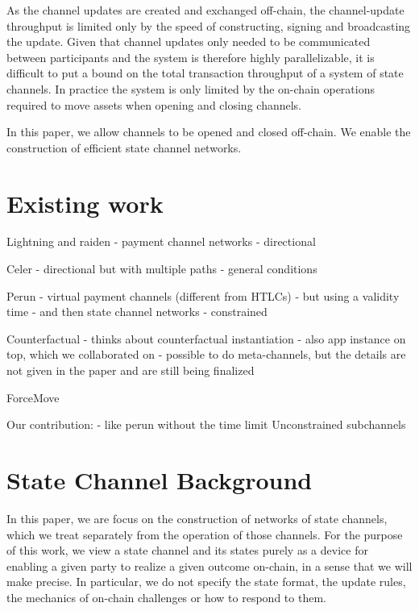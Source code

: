 \documentclass{article}
\theoremstyle{definition}
\begin{document}
As the channel updates are created and exchanged off-chain, the channel-update throughput is limited only by the speed of constructing, signing and broadcasting the update.
Given that channel updates only needed to be communicated between participants and the system is therefore highly parallelizable, it is difficult to put a bound on the total transaction throughput of a system of state channels.
In practice the system is only limited by the on-chain operations required to move assets when opening and closing channels.

In this paper, we allow channels to be opened and closed off-chain. We enable the construction of efficient state channel networks.

\section{Existing work}

Lightning and raiden
- payment channel networks
- directional

Celer
- directional but with multiple paths
- general conditions

Perun
- virtual payment channels (different from HTLCs)
- but using a validity time
- and then state channel networks
- constrained

Counterfactual
- thinks about counterfactual instantiation
- also app instance on top, which we collaborated on
- possible to do meta-channels, but the details are not given in the paper and are still being finalized

ForceMove

Our contribution:
- like perun without the time limit
Unconstrained subchannels

\section{State Channel Background}

In this paper, we are focus on the construction of networks of state channels, which we treat separately from the operation of those channels.
For the purpose of this work, we view a state channel and its states purely as a device for enabling a given party to realize a given outcome on-chain, in a sense that we will make precise.
In particular, we do not specify the state format, the update rules, the mechanics of on-chain challenges or how to respond to them.
\end{document}
